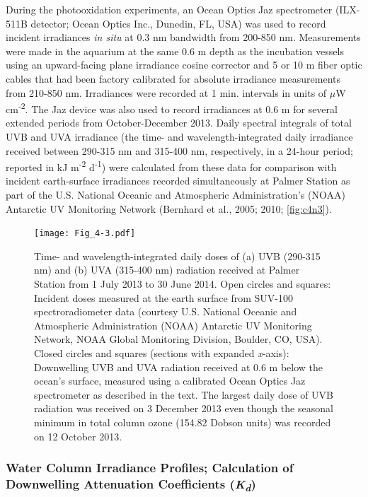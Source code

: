 During the photooxidation experiments, an Ocean Optics Jaz spectrometer (ILX-511B detector; Ocean Optics Inc., Dunedin, FL, USA) was used to record incident irradiances \emph{in situ} at 0.3 nm bandwidth from 200-850 nm. Measurements were made in the aquarium at the same 0.6 m depth as the incubation vessels using an upward-facing plane irradiance cosine corrector and 5 or 10 m fiber optic cables that had been factory calibrated for absolute irradiance measurements from 210-850 nm. Irradiances were recorded at 1 min. intervals in units of $\mu$W cm\textsuperscript{-2}. The Jaz device was also used to record irradiances at 0.6 m for several extended periods from October-December 2013. Daily spectral integrals of total UVB and UVA irradiance (the time- and wavelength-integrated daily irradiance received between 290-315 nm and 315-400 nm, respectively, in a 24-hour period; reported in kJ m\textsuperscript{-2} d\textsuperscript{-1}) were calculated from these data for comparison with incident earth-surface irradiances recorded simultaneously at Palmer Station as part of the U.S. National Oceanic and Atmospheric Administration's (NOAA) Antarctic UV Monitoring Network (Bernhard et al., 2005; 2010; \autoref{fig:c4n3}).
\begin{figure}[!p]
\centering
\texttt{[image: Fig\_4-3.pdf]}
\caption[Daily doses of UVA and UVB radiation received at Palmer Station in 2013-2014]{Time- and wavelength-integrated daily doses of (a) UVB (290-315 nm) and (b) UVA (315-400 nm) radiation received at Palmer Station from 1 July 2013 to 30 June 2014. Open circles and squares: Incident doses measured at the earth surface from SUV-100 spectroradiometer data (courtesy U.S. National Oceanic and Atmospheric Administration (NOAA) Antarctic UV Monitoring Network, NOAA Global Monitoring Division, Boulder, CO, USA). Closed circles and squares (sections with expanded \emph{x}-axis): Downwelling UVB and UVA radiation received at 0.6 m below the ocean's surface, measured using a calibrated Ocean Optics Jaz spectrometer as described in the text. The largest daily dose of UVB radiation was received on 3 December 2013 even though the seasonal minimum in total column ozone (154.82 Dobson units) was recorded on 12 October 2013.}
\label{fig:c4n3}
\end{figure}

\subsubsection{Water Column Irradiance Profiles; Calculation of Downwelling Attenuation Coefficients (\emph{K\textsubscript{d}})}
\label{sssec:Water Column Irradiance Profiles; Calculation of Downwelling Attenuation Coefficients}


